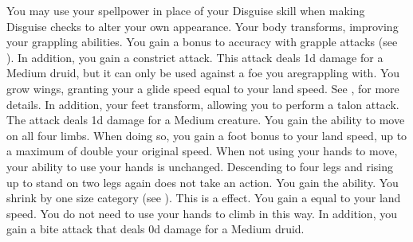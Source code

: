         You may use your spellpower in place of your Disguise skill when making Disguise checks to alter your own appearance.
        Your body transforms, improving your grappling abilities.
        You gain a  bonus to accuracy with grapple attacks (see ).
        In addition, you gain a constrict attack.
        This attack deals \plus1d damage for a Medium druid, but it can only be used against a foe you aregrappling with.
        You grow wings, granting your a glide speed equal to your land speed.
        See , for more details.
        In addition, your feet transform, allowing you to perform a talon attack.
        The attack deals \minus1d damage for a Medium creature.
        You gain the ability to move on all four limbs.
        When doing so, you gain a  foot bonus to your land speed, up to a maximum of double your original speed.
        When not using your hands to move, your ability to use your hands is unchanged.
        Descending to four legs and rising up to stand on two legs again does not take an action.
        You gain the  ability.
        You shrink by one size category (see ).
        This is a  effect.
        You gain a  equal to your land speed.
        You do not need to use your hands to climb in this way.
        In addition, you gain a bite attack that deals \plus0d damage for a Medium druid.


